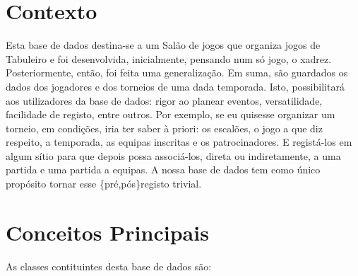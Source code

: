 \documentclass[a4paper]{article}
\begin{document}





\section{Contexto}
Esta base de dados destina-se a um Salão de jogos que organiza jogos de Tabuleiro e foi desenvolvida, inicialmente, pensando num só jogo, o xadrez. Posteriormente, então, foi feita uma generalização. Em suma, são guardados os dados dos jogadores e dos torneios de uma dada temporada. Isto, possibilitará aos utilizadores da base de dados: rigor ao planear eventos, versatilidade, facilidade de registo, entre outros. Por exemplo, se eu quisesse organizar um torneio, em condições, iria ter saber à priori: os escalões, o jogo a que diz respeito, a temporada, as equipas inscritas e os patrocinadores. E registá-los em algum sítio para que depois possa associá-los, direta ou indiretamente, a uma partida e uma partida a equipas. A nossa base de dados tem como único propósito tornar esse \{pré,pós\}registo trivial.

\section{Conceitos Principais}


As classes contituintes desta base de dados são:
\end{document}
